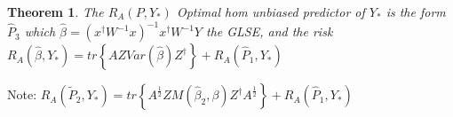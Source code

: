 \documentclass{article}
\newtheorem{theorem}{Theorem}
\begin{document}
\bigskip 

\begin{theorem}
The $R_{A}\left( P,Y_{\ast }\right) $ Optimal hom unbiased predictor of $%
Y_{\ast }$ is the form $\hat{P}_{3}$ which $\hat{\beta}=\left( x^{\dagger
}W^{-1}x\right) ^{-1}x^{\dagger }W^{-1}Y$ the GLSE, and the risk $%
R_{A}\left( \hat{\beta},Y_{\ast }\right) =tr\left\{ AZVar\left( \hat{\beta}%
\right) Z^{\dagger }\right\} +R_{A}\left( \hat{P}_{1},Y_{\ast }\right) $
\end{theorem}

Note: $R_{A}\left( \tilde{P}_{2},Y_{\ast }\right) =tr\left\{ A^{\frac{1}{2}%
}ZM\left( \hat{\beta}_{2},\beta \right) Z^{\dagger }A^{\frac{1}{2}}\right\}
+R_{A}\left( \hat{P}_{1},Y_{\ast }\right) $
\end{document}
